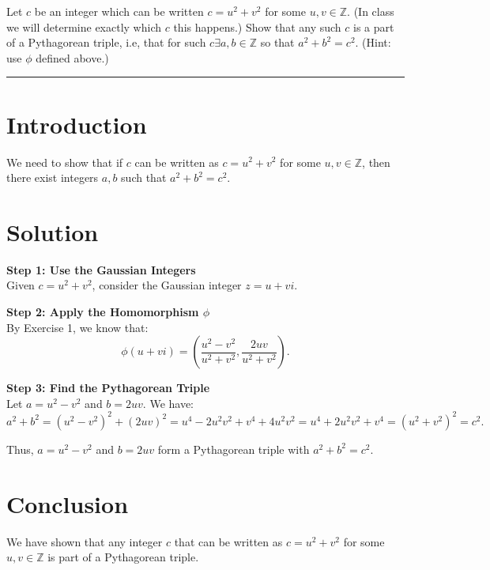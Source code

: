 \documentclass[12pt]{amsart}
\theoremstyle{definition}
\numberwithin{equation}{section}
\newcommand{\Z}{\mathbb{Z}}
\begin{document}
\begin{exercise}{5} Let \(c\) be an integer which can be written \(c = u^2+v^2\) for some \(u,v \in \Z \). (In class we will determine exactly which \(c\) this happens.) Show that any such \(c\) is a part of a Pythagorean triple, i.e, that for such \(c \exists a,b \in \Z \) so that \(a^2+b^2=c^2\). (Hint: use \(\phi \) defined above.)

    \noindent\rule{\linewidth}{1pt}

    \section*{Introduction}
    We need to show that if \(c\) can be written as \(c = u^2 + v^2\) for some \(u, v \in \Z \), then there exist integers \(a, b\) such that \(a^2 + b^2 = c^2\).

    \section*{Solution}
    \noindent \textbf{Step 1: Use the Gaussian Integers}\\
    Given \(c = u^2 + v^2\), consider the Gaussian integer \(z = u + vi\).

    \noindent \textbf{Step 2: Apply the Homomorphism \(\phi \)}\\
    By Exercise 1, we know that:
    \[
    \phi(u + vi) = \left(\frac{u^2 - v^2}{u^2 + v^2}, \frac{2uv}{u^2 + v^2}\right).
    \]

    \noindent \textbf{Step 3: Find the Pythagorean Triple}\\
    Let \(a = u^2 - v^2\) and \(b = 2uv\). We have:
    \[
    a^2 + b^2 = {(u^2 - v^2)}^2 + {(2uv)}^2 = u^4 - 2u^2v^2 + v^4 + 4u^2v^2 = u^4 + 2u^2v^2 + v^4 = {(u^2 + v^2)}^2 = c^2.
    \]

    Thus, \(a = u^2 - v^2\) and \(b = 2uv\) form a Pythagorean triple with \(a^2 + b^2 = c^2\).

    \section*{Conclusion}
    We have shown that any integer \(c\) that can be written as \(c = u^2 + v^2\) for some \(u, v \in \Z \) is part of a Pythagorean triple.

\end{exercise}
\newpage
\end{document}
